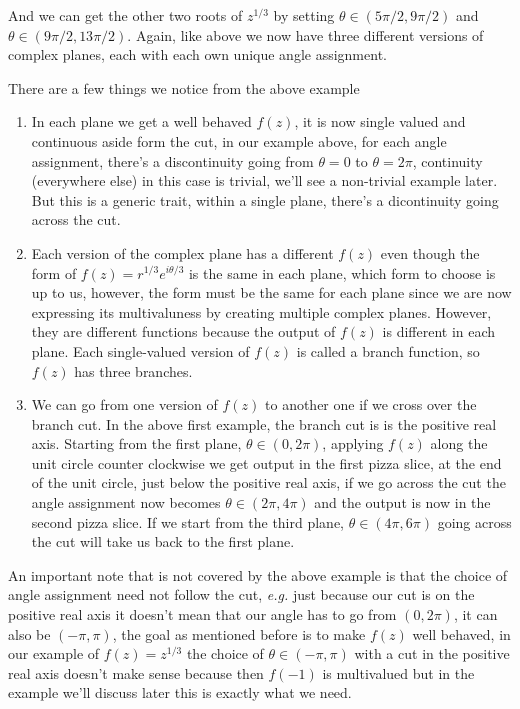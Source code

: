 \documentclass[aps,preprint,preprintnumbers,nofootinbib,showpacs,prd]{revtex4-1}
\newcommand{\eg}{{\it e.g.} }
\begin{document}
And we can get the other two roots of $z^{1/3}$ by setting $\theta \in (5\pi/2, 9\pi/2)$ and $\theta \in (9\pi/2, 13\pi/2)$. Again, like above we now have three different versions of complex planes, each with each own unique angle assignment.

There are a few things we notice from the above example
%
\begin{enumerate}
%
\item In each plane we get a well behaved $f(z)$, it is now single valued and continuous aside form the cut, in our example above, for each angle assignment, there's a discontinuity going from $\theta = 0$ to $\theta=2\pi$, continuity (everywhere else) in this case is trivial, we'll see a non-trivial example later. But this is a generic trait, within a single plane, there's a dicontinuity going across the cut.
%
\item Each version of the complex plane has a different $f(z)$ even though the form of $f(z) = r^{1/3}e^{i\theta/3}$ is the same in each plane, which form to choose is up to us, however, the form must be the same for each plane since we are now expressing its multivaluness by creating multiple complex planes. However, they are different functions because the output of $f(z)$ is different in each plane. Each single-valued version of $f(z)$ is called a branch function, so $f(z)$ has three branches.
%
\item We can go from one version of $f(z)$ to another one if we cross over the branch cut. In the above first example, the branch cut is is the positive real axis. Starting from the first plane, $\theta \in (0,2\pi)$, applying $f(z)$ along the unit circle counter clockwise we get output in the first pizza slice, at the end of the unit circle, just below the positive real axis, if we go across the cut the angle assignment now becomes $\theta \in (2\pi, 4\pi)$ and the output is now in the second pizza slice. If we start from the third plane, $\theta \in (4\pi, 6\pi)$ going across the cut will take us back to the first plane.
\end{enumerate}
%
An important note that is not covered by the above example is that the choice of angle assignment need not follow the cut, \eg just because our cut is on the positive real axis it doesn't mean that our angle has to go from $(0, 2\pi)$, it can also be $(-\pi,\pi)$, the goal as mentioned before is to make $f(z)$ well behaved, in our example of $f(z) = z^{1/3}$ the choice of $\theta \in (-\pi,\pi)$ with a cut in the positive real axis doesn't make sense because then $f(-1)$ is multivalued but in the example we'll discuss later this is exactly what we need.
\end{document}
